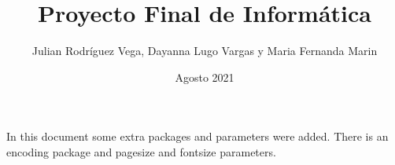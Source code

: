 \documentclass[12pt]{article}
\title{Proyecto Final de Informática}
\author{Julian Rodríguez Vega, Dayanna Lugo Vargas y Maria Fernanda Marin}
\date{Agosto 2021}
\begin{document}
\begin{titlepage}
\maketitle
\end{titlepage}

In this document some extra packages and parameters
were added. There is an encoding package
and pagesize and fontsize parameters.
\end{document}
